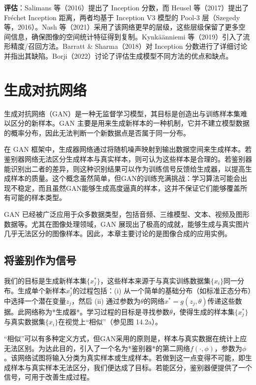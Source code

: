 \documentclass[lang=cn,newtx,10pt,scheme=chinese]{elegantbook}
\begin{document}
\textbf{评估}：Salimans 等（2016）提出了 Inception 分数，而 Heusel 等（2017）提出了 Fréchet Inception 距离，两者均基于 Inception V3 模型的 Pool-3 层（Szegedy 等，2016）。Nash 等（2021）采用了该网络更早的层级，这些层级保留了更多空间信息，确保图像的空间统计特征得到复制。Kynkäänniemi 等（2019）引入了流形精度/召回方法。Barratt \& Sharma（2018）对 Inception 分数进行了详细讨论并指出其缺陷。Borji（2022）讨论了评估生成模型不同方法的优点和缺点。

\chapter{生成对抗网络}

生成对抗网络（GAN）是一种无监督学习模型，其目标是创造出与训练样本集难以区分的新样本。GAN 主要是用来生成新样本的一种机制，它并不建立模型数据的概率分布，因此无法判断一个新数据点是否属于同一分布。

在 GAN 框架中，生成器网络通过将随机噪声映射到输出数据空间来生成样本。若鉴别器网络无法区分生成样本与真实样本，则可认为这些样本是合理的。若鉴别器能识别出二者的差异，则这种识别结果可以作为训练信号反馈给生成器，以提高生成样本的质量。这个概念虽然简单，但GAN的训练充满挑战：学习算法可能会出现不稳定，而且虽然GAN能够生成高度逼真的样本，这并不保证它们能够覆盖所有可能的样本类型。

GAN 已经被广泛应用于众多数据类型，包括音频、三维模型、文本、视频及图形数据等。尤其在图像处理领域，GAN 展现出了极高的成就，能够生成与真实图片几乎无法区分的图像样本。因此，本章主要讨论的是图像合成的应用实例。

\section{将鉴别作为信号}
我们的目标是生成新样本集\(\{x_j^*\}\)，这些样本来源于与真实训练数据集\(\{x_i\}\)同一分布。生成单个新样本\(x_j^*\)的过程包括：(i) 从一个简单的基础分布（如标准正态分布）中选择一个潜在变量\(z_j\)，然后 (ii) 通过参数为\(\theta\)的网络\(x^* = g(z_j, \theta)\)传递这些数据。此网络称为*生成器*。学习过程的目标是寻找参数\(\theta\)，使得生成的样本集\(\{x_j^*\}\)与真实数据集\(\{x_i\}\)在视觉上“相似”（参见图 14.2a）。

“相似”可以有多种定义方式，但GAN采用的原则是，样本与真实数据在统计上应无法区别。为达此目的，引入了一个名为*鉴别器*的第二网络\(f(\cdot, \phi)\)，参数为\(\phi\)。该网络试图将输入分类为真实样本或生成样本。若做到这一点变得不可能，即生成样本与真实样本无法区分，我们便达成了目标。若能区分，鉴别器便提供了一个信号，可用于改善生成过程。
\end{document}
